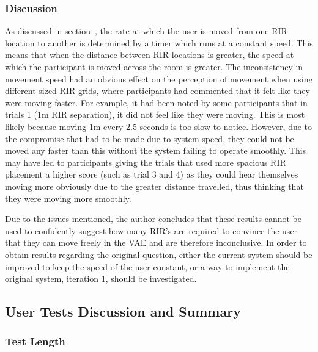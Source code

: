 \documentclass[../../main.tex]{subfiles}
\begin{document}
			\subsubsection{Discussion}

			As discussed in section~, the rate at which the user is moved from one \ac{RIR} location to another is determined by a timer which runs at a constant speed. This means that when the distance between \ac{RIR} locations is greater, the speed at which the participant is moved across the room is greater. The inconsistency in movement speed had an obvious effect on the perception of movement when using different sized \ac{RIR} grids, where participants had commented that it felt like they were moving faster. For example, it had been noted by some participants that in trials 1 (1m \ac{RIR} separation), it did not feel like they were moving. This is most likely because moving 1m every 2.5 seconds is too slow to notice. However, due to the compromise that had to be made due to system speed, they could not be moved any faster than this without the system failing to operate smoothly. This may have led to participants giving the trials that used more spacious \ac{RIR} placement a higher score (such as trial 3 and 4) as they could hear themselves moving more obviously due to the greater distance travelled, thus thinking that they were moving more smoothly.

			Due to the issues mentioned, the author concludes that these results cannot be used to confidently suggest how many \ac{RIR}'s are required to convince the user that they can move freely in the \ac{VAE} and are therefore inconclusive. In order to obtain results regarding the original question, either the current system should be improved to keep the speed of the user constant, or a way to implement the original system, iteration 1, should be investigated.

		\subsection{User Tests Discussion and Summary}

			\subsubsection{Test Length}
\end{document}
